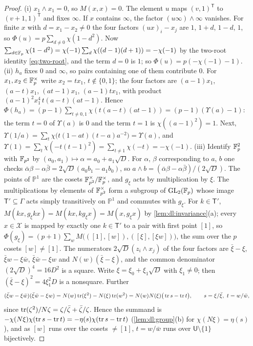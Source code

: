 \begin{proof}
(i) $x_1\wedge x_1=0$, so $M(x,x)=0$. The element $u$ maps $(v,1)^{\mathsf T}$
to $(v+1,1)^{\mathsf T}$ and fixes $\infty$. If $x$ contains $\infty$, the
factor $(u\infty)\wedge\infty$ vanishes. For finite $x$ with $d=x_1-x_2\ne0$
the four factors $(ux)_i-x_j$ are $1$, $1+d$, $1-d$, $1$, so
$\Phi(u)=p\sum_{d\ne0}\chi(1-d^2)$. Now
$\sum_{d\in\mathbb F_p}\chi(1-d^2)=\chi(-1)\sum_d\chi((d-1)(d+1))=-\chi(-1)$ by the
two-root identity \eqref{eq:two-root}, and the term $d=0$ is $1$; so
$\Phi(u)=p(-\chi(-1)-1)$.
(ii) $h_a$ fixes $0$ and $\infty$, so pairs containing one of them contribute
$0$. For $x_1,x_2\in\mathbb F_p^\times$ write $x_2=tx_1$, $t\notin\{0,1\}$; the four
factors are $(a-1)x_1$, $(a-t)x_1$, $(at-1)x_1$, $(a-1)tx_1$, with product
$(a-1)^2x_1^4\,t(a-t)(at-1)$. Hence
$\Phi(h_a)=(p-1)\sum_{t\ne0,1}\chi(t(a-t)(at-1))=(p-1)(\Upsilon(a)-1)$: the
term $t=0$ of $\Upsilon(a)$ is $0$ and the term $t=1$ is $\chi((a-1)^2)=1$.
Next, $\Upsilon(1/a)=\sum_t\chi\big(t(1-at)(t-a)a^{-2}\big)=\Upsilon(a)$, and
$\Upsilon(1)=\sum_t\chi(-t(t-1)^2)=\sum_{t\ne1}\chi(-t)=-\chi(-1)$.
(iii) Identify $\mathbb F_p^2$ with $\mathbb F_{p^2}$ by $(a_0,a_1)\mapsto\alpha=a_0+a_1\sqrt D$.
For $\alpha$, $\beta$ corresponding to $a$, $b$ one checks
$\bar\alpha\beta-\alpha\bar\beta=2\sqrt D(a_0b_1-a_1b_0)$, so
$a\wedge b=(\bar\alpha\beta-\alpha\bar\beta)/(2\sqrt D)$. The points of
$\mathbb P^1$ are the cosets $\mathbb F_{p^2}^\times/\mathbb F_p^\times$, and $g_\xi$ acts by
multiplication by $\xi$. The multiplications by elements of $\mathbb F_{p^2}^\times$
form a subgroup of $\mathrm{GL}_2(\mathbb F_p)$ whose image $\mathsf T'\subseteq\Gamma$
acts simply transitively on $\mathbb P^1$ and commutes with $g_\xi$. For
$k\in\mathsf T'$, $M(kx,g_\xi kx)=M(kx,kg_\xi x)=M(x,g_\xi x)$ by
\cref{lem:dl:invariance}(a); every $x\in\mathcal X$ is mapped by exactly one
$k\in\mathsf T'$ to a pair with first point $[1]$, so
$\Phi(g_\xi)=(p+1)\sum_wM\big(([1],[w]),([\xi],[\xi w])\big)$, the sum over the
$p$ cosets $[w]\ne[1]$. The numerators $2\sqrt D(z_i\wedge x_j)$ of the four
factors are $\bar\xi-\xi$, $\bar\xi w-\xi\bar w$, $\bar\xi\bar w-\xi w$ and
$N(w)(\bar\xi-\xi)$, and the common denominator $(2\sqrt D)^4=16D^2$ is a
square. Write $\xi=\xi_0+\xi_1\sqrt D$ with $\xi_1\ne0$; then
$(\bar\xi-\xi)^2=4\xi_1^2D$ is a nonsquare. Further
\[
  (\bar\xi w-\xi\bar w)(\bar\xi\bar w-\xi w)=N(w)\operatorname{tr}(\xi^2)-N(\xi)\operatorname{tr}(w^2)
  =N(w)N(\xi)\big(\operatorname{tr} s-\operatorname{tr} t\big),\qquad s=\xi/\bar\xi,\ t=w/\bar w,
\]
since $\operatorname{tr}(\zeta^2)/N\zeta=\zeta/\bar\zeta+\bar\zeta/\zeta$. Hence the summand
is $-\chi(N\xi)\chi(\operatorname{tr} s-\operatorname{tr} t)=-\eta(s)\chi(\operatorname{tr} s-\operatorname{tr} t)$
(\cref{lem:dl:group}(b) for $\chi(N\xi)=\eta(s)$), and as $[w]$ runs over the
cosets $\ne[1]$, $t=w/\bar w$ runs over $\mathsf U\setminus\{1\}$ bijectively.
\end{proof}

